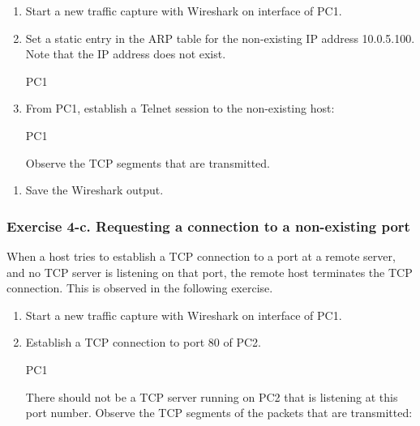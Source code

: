 \begin{enumerate}
	\item Start a new traffic capture with Wireshark on interface  of PC1.
	\item Set a static entry in the ARP table for the non-existing IP address 10.0.5.100. Note that the IP address does not exist.
		\begin{cmdblock}
	PC1%
		\end{cmdblock}
	\item From PC1, establish a Telnet session to the non-existing host: 
		\begin{cmdblock}
	PC1%
		\end{cmdblock}
		Observe the TCP segments that are transmitted.
\end{enumerate}

\begin{questions}
\end{questions}

\begin{enumerate}[resume]
	\item Save the Wireshark output.
\end{enumerate}

\subsubsection{Exercise 4-c. Requesting a connection to a non-existing port}

When a host tries to establish a TCP connection to a port at a remote server, and no TCP server is listening on that port, the remote host terminates the TCP connection. This is observed in the following exercise.

\begin{enumerate}
	\item Start a new traffic capture with Wireshark on interface  of PC1.
	\item Establish a TCP connection to port 80 of PC2.
		\begin{cmdblock}
	PC1%
		\end{cmdblock}
		There should not be a TCP server running on PC2 that is listening at this port number. Observe the TCP segments of the packets that are transmitted:
\end{enumerate}

